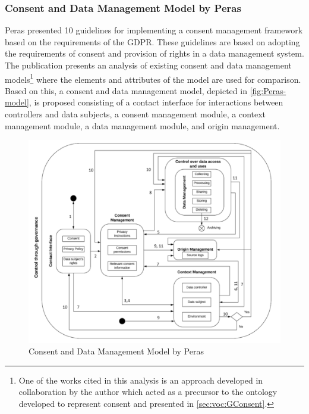 \subsubsection{Consent and Data Management Model by Peras}
Peras \cite{peras_guidelines_2018} presented 10 guidelines for implementing a consent management framework based on the requirements of the GDPR. These guidelines are based on adopting the requirements of consent and provision of rights in a data management system. The publication presents an analysis of existing consent and data management models\footnote{One of the works cited in this analysis is an approach developed in collaboration by the author \cite{fatema_compliance_2017} which acted as a precursor to the ontology developed to represent consent and presented in \autoref{sec:voc:GConsent}.} where the elements and attributes of the model are used for comparison. Based on this, a consent and data management model, depicted in \autoref{fig:Peras-model}, is proposed consisting of a contact interface for interactions between controllers and data subjects, a consent management module, a context management module, a data management module, and origin management.
\begin{figure}[htbp]
    \centering
    \includegraphics[width=0.8\linewidth]{img/Peras_model.png}
    \caption{Consent and Data Management Model by Peras \cite{peras_guidelines_2018}}
    \label{fig:Peras-model}
\end{figure}

